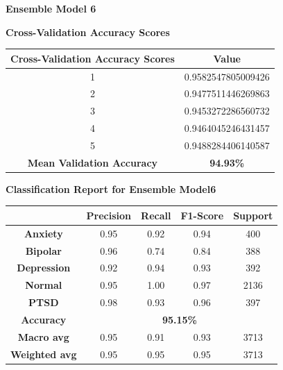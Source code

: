 \pagebreak

\vspace{1em}
\noindent
\textbf{Ensemble Model 6}

\begin{center}
    \textbf{Cross-Validation Accuracy Scores} \\[0.5em]
    \begin{tabular}{|c|c|}
        \hline
        \textbf{Cross-Validation Accuracy Scores} & \textbf{Value} \\ \hline
        1 & 0.9582547805009426 \\ \hline
        2 & 0.9477511446269863 \\ \hline
        3 & 0.9453272286560732 \\ \hline
        4 & 0.9464045246431457 \\ \hline
        5 & 0.9488284406140587 \\ \hline
        \textbf{Mean Validation Accuracy} & \textbf{94.93\%} \\ \hline
    \end{tabular}
\end{center}

\begin{center}
    \textbf{Classification Report for Ensemble Model6} \\[0.5em]
    \begin{tabular}{|c|c|c|c|c|}
        \hline
        & \textbf{Precision} & \textbf{Recall} & \textbf{F1-Score} & \textbf{Support} \\ \hline
        \textbf{Anxiety}    & 0.95 & 0.92 & 0.94 & 400 \\ \hline
        \textbf{Bipolar}    & 0.96 & 0.74 & 0.84 & 388 \\ \hline
        \textbf{Depression} & 0.92 & 0.94 & 0.93 & 392 \\ \hline
        \textbf{Normal}     & 0.95 & 1.00 & 0.97 & 2136 \\ \hline
        \textbf{PTSD}       & 0.98 & 0.93 & 0.96 & 397 \\ \hline
        \textbf{Accuracy}   & \multicolumn{4}{c|}{\textbf{95.15\%}} \\ \hline
        \textbf{Macro avg}  & 0.95 & 0.91 & 0.93 & 3713 \\ \hline
        \textbf{Weighted avg} & 0.95 & 0.95 & 0.95 & 3713 \\ \hline
    \end{tabular}
\end{center}


